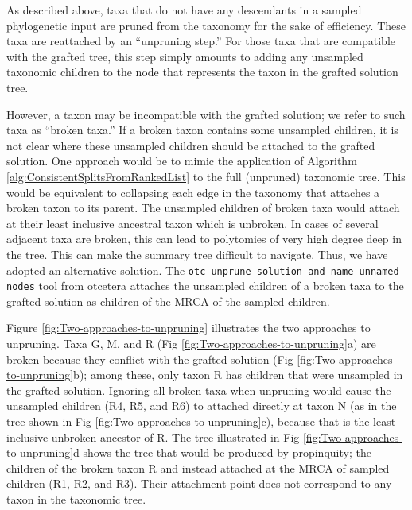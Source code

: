 \documentclass[fleqn,12pt,lineno,english]{wlpeerj}
\begin{document}
As described above, taxa that do not have any descendants in a sampled
phylogenetic input are pruned from the taxonomy for the sake of efficiency.
These taxa are reattached by an ``unpruning step.'' For those taxa
that are compatible with the grafted tree, this step simply amounts
to adding any unsampled taxonomic children to the node that represents
the taxon in the grafted solution tree.

However, a taxon may be incompatible with the grafted solution; we
refer to such taxa as ``broken taxa.'' If a broken taxon contains
some unsampled children, it is not clear where these unsampled children
should be attached to the grafted solution. One approach would be
to mimic the application of Algorithm \ref{alg:ConsistentSplitsFromRankedList}
to the full (unpruned) taxonomic tree. This would be equivalent to
collapsing each edge in the taxonomy that attaches a broken taxon
to its parent. The unsampled children of broken taxa would attach
at their least inclusive ancestral taxon which is unbroken. In cases
of several adjacent taxa are broken, this can lead to polytomies of
very high degree deep in the tree. This can make the summary tree
difficult to navigate. Thus, we have adopted an alternative solution.
The \texttt{otc-unprune-solution-and-name-unnamed-nodes} tool from
otcetera attaches the unsampled children of a broken taxa to the grafted
solution as children of the MRCA of the sampled children.

Figure \ref{fig:Two-approaches-to-unpruning} illustrates the two
approaches to unpruning. Taxa G, M, and R (Fig \ref{fig:Two-approaches-to-unpruning}a)
are broken because they conflict with the grafted solution (Fig \ref{fig:Two-approaches-to-unpruning}b);
among these, only taxon R has children that were unsampled in the
grafted solution. Ignoring all broken taxa when unpruning would cause
the unsampled children (R4, R5, and R6) to attached directly at taxon
N (as in the tree shown in Fig \ref{fig:Two-approaches-to-unpruning}c),
because that is the least inclusive unbroken ancestor of R. The tree
illustrated in Fig \ref{fig:Two-approaches-to-unpruning}d shows the
tree that would be produced by propinquity; the children of the broken
taxon R and instead attached at the MRCA of sampled children (R1,
R2, and R3). Their attachment point does not correspond to any taxon
in the taxonomic tree.
\end{document}
